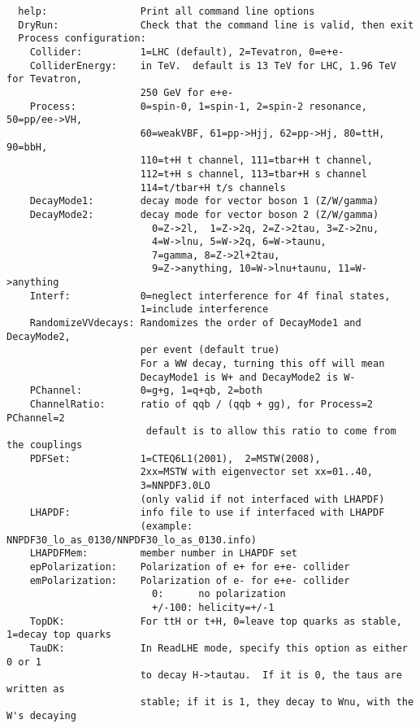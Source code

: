 \documentclass[aps,superscriptaddress,nofootinbib]{revtex4}
\begin{document}
\begin{verbatim}
  help:                Print all command line options
  DryRun:              Check that the command line is valid, then exit
  Process configuration:
    Collider:          1=LHC (default), 2=Tevatron, 0=e+e-
    ColliderEnergy:    in TeV.  default is 13 TeV for LHC, 1.96 TeV for Tevatron,
                       250 GeV for e+e-
    Process:           0=spin-0, 1=spin-1, 2=spin-2 resonance, 50=pp/ee->VH,
                       60=weakVBF, 61=pp->Hjj, 62=pp->Hj, 80=ttH, 90=bbH,
                       110=t+H t channel, 111=tbar+H t channel,
                       112=t+H s channel, 113=tbar+H s channel
                       114=t/tbar+H t/s channels
    DecayMode1:        decay mode for vector boson 1 (Z/W/gamma)
    DecayMode2:        decay mode for vector boson 2 (Z/W/gamma)
                         0=Z->2l,  1=Z->2q, 2=Z->2tau, 3=Z->2nu,
                         4=W->lnu, 5=W->2q, 6=W->taunu,
                         7=gamma, 8=Z->2l+2tau,
                         9=Z->anything, 10=W->lnu+taunu, 11=W->anything
    Interf:            0=neglect interference for 4f final states,
                       1=include interference
    RandomizeVVdecays: Randomizes the order of DecayMode1 and DecayMode2,
                       per event (default true)
                       For a WW decay, turning this off will mean
                       DecayMode1 is W+ and DecayMode2 is W-
    PChannel:          0=g+g, 1=q+qb, 2=both
    ChannelRatio:      ratio of qqb / (qqb + gg), for Process=2 PChannel=2
                        default is to allow this ratio to come from the couplings
    PDFSet:            1=CTEQ6L1(2001),  2=MSTW(2008),
                       2xx=MSTW with eigenvector set xx=01..40,
                       3=NNPDF3.0LO
                       (only valid if not interfaced with LHAPDF)
    LHAPDF:            info file to use if interfaced with LHAPDF
                       (example: NNPDF30_lo_as_0130/NNPDF30_lo_as_0130.info)
    LHAPDFMem:         member number in LHAPDF set
    epPolarization:    Polarization of e+ for e+e- collider
    emPolarization:    Polarization of e- for e+e- collider
                         0:      no polarization
                         +/-100: helicity=+/-1
    TopDK:             For ttH or t+H, 0=leave top quarks as stable, 1=decay top quarks
    TauDK:             In ReadLHE mode, specify this option as either 0 or 1
                       to decay H->tautau.  If it is 0, the taus are written as
                       stable; if it is 1, they decay to Wnu, with the W's decaying

\end{verbatim}
\end{document}
